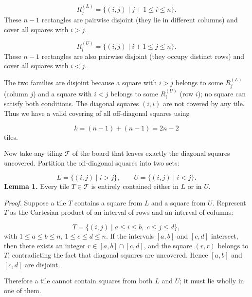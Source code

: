 \[
  R^{(L)}_j = \{(i,j) \mid j+1 \le i \le n\}.
  \]
These \(n-1\) rectangles are pairwise disjoint (they lie in different columns) and cover all squares with \(i>j\).\par
{}
\[
  R^{(U)}_i = \{(i,j) \mid i+1 \le j \le n\}.
  \]
These \(n-1\) rectangles are also pairwise disjoint (they occupy distinct rows) and cover all squares with \(i<j\).\par
The two families are disjoint because a square with \(i>j\) belongs to some \(R^{(L)}_j\) (column \(j\)) and a square with \(i<j\) belongs to some \(R^{(U)}_i\) (row \(i\)); no square can satisfy both conditions. The diagonal squares \((i,i)\) are not covered by any tile. Thus we have a valid covering of all off-diagonal squares using\par
\[
k = (n-1)+(n-1) = 2n-2
\]
tiles.\par
\smallskip
{}
Now take any tiling \(\mathcal{T}\) of the board that leaves exactly the diagonal squares uncovered. Partition the off-diagonal squares into two sets:\par
\[
L = \{(i,j) \mid i > j\}, \qquad U = \{(i,j) \mid i < j\}.
\]
\textbf{Lemma 1.} Every tile \(T \in \mathcal{T}\) is entirely contained either in \(L\) or in \(U\).\par
\emph{Proof.} Suppose a tile \(T\) contains a square from \(L\) and a square from \(U\). Represent \(T\) as the Cartesian product of an interval of rows and an interval of columns:\par
\[
T = \{(i,j) \mid a \le i \le b,\; c \le j \le d\},
\]
with \(1 \le a \le b \le n\), \(1 \le c \le d \le n\). If the intervals \([a,b]\) and \([c,d]\) intersect, then there exists an integer \(r \in [a,b] \cap [c,d]\), and the square \((r,r)\) belongs to \(T\), contradicting the fact that diagonal squares are uncovered. Hence \([a,b]\) and \([c,d]\) are disjoint.\par
{}
Therefore a tile cannot contain squares from both \(L\) and \(U\); it must lie wholly in one of them.\par

